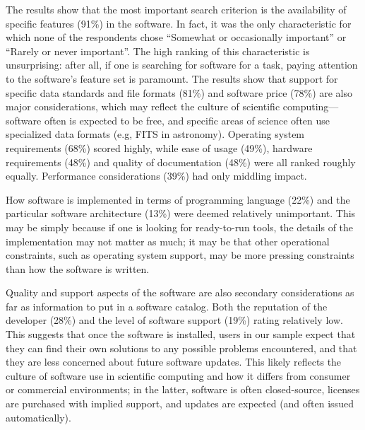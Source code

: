 \documentclass{casicswhitepaper}
\begin{document}


The results show that the most important search criterion is the availability of specific features (91\%) in the software.  In fact, it was the only characteristic for which none of the respondents chose ``Somewhat or occasionally important'' or ``Rarely or never important''.  The high ranking of this characteristic is unsurprising: after all, if one is searching for software for a task, paying attention to the software's feature set is paramount.  The results show that support for specific data standards and file formats (81\%) and software price (78\%) are also major considerations, which may reflect the culture of scientific computing---software often is expected to be free, and specific areas of science often use specialized data formats (e.g, FITS in astronomy).  Operating system requirements (68\%) scored highly, while ease of usage (49\%), hardware requirements (48\%) and quality of documentation (48\%) were all ranked roughly equally.  Performance considerations (39\%) had only middling impact.

How software is implemented in terms of programming language (22\%) and the particular software architecture (13\%) were deemed relatively unimportant.  This may be simply because if one is looking for ready-to-run tools, the details of the implementation may not matter as much; it may be that other operational constraints, such as operating system support, may be more pressing constraints than how the software is written.


Quality and support aspects of the software are also secondary considerations as far as information to put in a software catalog.  Both the reputation of the developer (28\%) and the level of software support (19\%) rating relatively low.  This suggests that once the software is installed, users in our sample expect that they can find their own solutions to any possible problems encountered, and that they are less concerned about future software updates. This likely reflects the culture of software use in scientific computing and how it differs from consumer or commercial environments; in the latter, software is often closed-source, licenses are purchased with implied support, and updates are expected (and often issued automatically).
\end{document}
